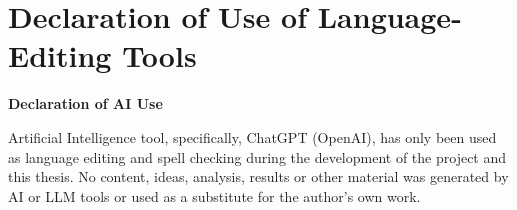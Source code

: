 \cleardoublepage
{}
{}


\bigskip

\begingroup
\let\clearpage\relax
\let\cleardoublepage\relax
\let\cleardoublepage\relax

\chapter*{Declaration of Use of Language-Editing Tools}


\textbf{Declaration of AI Use}

Artificial Intelligence tool, specifically, ChatGPT (OpenAI), has only been used as language editing and spell checking during the development of the project and this thesis.
No content, ideas, analysis, results or other material was generated by AI or LLM tools or used as a substitute for the author's own work.


\bigskip


\endgroup
